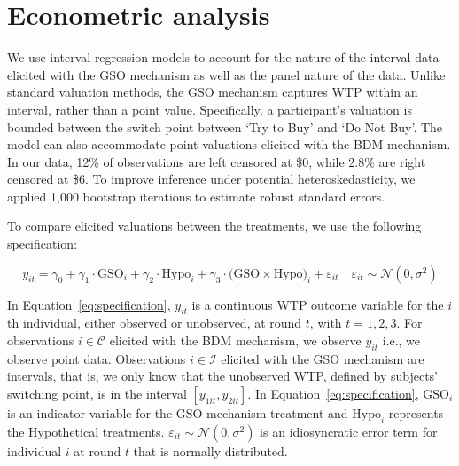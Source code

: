 \documentclass[12pt]{article}
\begin{document}


\section{Econometric analysis}
\label{Econometric}
We use interval regression models to account for the nature of the interval data elicited with the GSO mechanism as well as the panel nature of the data. Unlike standard valuation methods, the GSO mechanism captures WTP within an interval, rather than a point value. Specifically, a participant's valuation is bounded between the switch point between `Try to Buy' and `Do Not Buy'. The model can also accommodate point valuations elicited with the BDM mechanism. In our data, 12\% of observations are left censored at \$0, while 2.8\% are right censored at \$6. To improve inference under potential heteroskedasticity, we applied 1,000 bootstrap iterations to estimate robust standard errors.

To compare elicited valuations between the treatments, we use the following specification:
\vspace{-1cm}

\begin{equation}\label{eq:specification}
y_{it} = \gamma_0 + \gamma_1 \cdot \text{GSO}_i + \gamma_2 \cdot \text{Hypo}_i + \gamma_3 \cdot \text{(GSO} \times \text{Hypo)}_i +  \varepsilon_{it} 
\quad \varepsilon_{it} \sim \mathcal{N}(0, \sigma^2)
\end{equation}


In Equation~\ref{eq:specification}, $y_{it}$ is a continuous WTP outcome variable for the $i$th individual, either observed or unobserved, at round $t$, with $t = 1, 2, 3$. For observations $i \in \mathcal{C}$ elicited with the BDM mechanism, we observe $y_{it}$ i.e., we observe point data. Observations $i\in \mathcal{I}$ elicited with the GSO mechanism are intervals, that is, we only know that the unobserved WTP, defined by subjects' switching point, is in the interval $[y_{1it}, y_{2it}]$. In Equation~\ref{eq:specification}, $\text{GSO}_i$ is an indicator variable for the GSO mechanism treatment and $\text{Hypo}_i$ represents the Hypothetical treatments. $\varepsilon_{it} \sim \mathcal{N}(0, \sigma^2)$ is an idiosyncratic error term for individual $i$ at round $t$ that is normally distributed.
\end{document}
